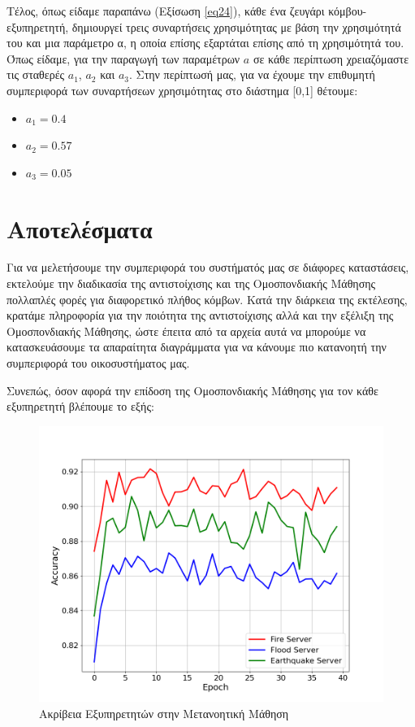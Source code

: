 Τέλος, όπως είδαμε παραπάνω (Εξίσωση \ref{eq24}), κάθε ένα ζευγάρι κόμβου-εξυπηρετητή, δημιουργεί τρεις συναρτήσεις χρησιμότητας με βάση την χρησιμότητά του και μια παράμετρο α, η οποία επίσης εξαρτάται επίσης από τη χρησιμότητά του. Όπως είδαμε, για την παραγωγή των παραμέτρων $a$ σε κάθε περίπτωση χρειαζόμαστε τις σταθερές $a_1$, $a_2$ και $a_3$. Στην περίπτωσή μας, για να έχουμε την επιθυμητή συμπεριφορά των συναρτήσεων χρησιμότητας στο διάστημα [0,1] θέτουμε:

\begin{itemize}
    \item $a_1 = 0.4$
    \item $a_2 = 0.57$
    \item $a_3 = 0.05$
\end{itemize}

\section{Αποτελέσματα}

Για να μελετήσουμε την συμπεριφορά του συστήματός μας σε διάφορες καταστάσεις, εκτελούμε την διαδικασία της αντιστοίχισης και της Ομοσπονδιακής Μάθησης πολλαπλές φορές για διαφορετικό πλήθος κόμβων. Κατά την διάρκεια της εκτέλεσης, κρατάμε πληροφορία για την ποιότητα της αντιστοίχισης αλλά και την εξέλιξη της Ομοσπονδιακής Μάθησης, ώστε έπειτα από τα αρχεία αυτά να μπορούμε να κατασκευάσουμε τα απαραίτητα διαγράμματα για να κάνουμε πιο κατανοητή την συμπεριφορά του οικοσυστήματος μας.

Συνεπώς, όσον αφορά την επίδοση της Ομοσπονδιακής Μάθησης για τον κάθε εξυπηρετητή βλέπουμε το εξής:

\begin{figure}[ht]
    \centering
    \includegraphics[width=\textwidth]{figures/chapter4/Server_Accuracies.png}
    \caption{Ακρίβεια Εξυπηρετητών στην Μετανοητική Μάθηση}
    \label{fig17}
\end{figure}

